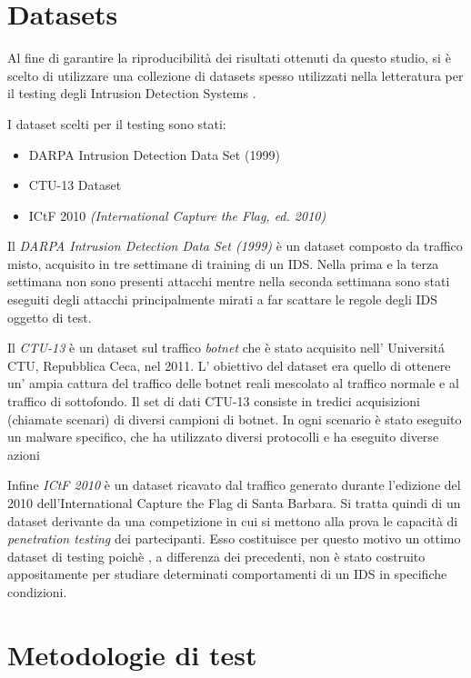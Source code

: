 \documentclass[12pt,a4paper,openright,twoside]{report}
\begin{document}
\section{Datasets}

Al fine di garantire la riproducibilit\`a dei risultati ottenuti da questo studio,
si \`e scelto di utilizzare una collezione di datasets spesso utilizzati nella letteratura
per il testing degli Intrusion Detection Systems \cite{EXP3}.

I dataset scelti per il testing sono stati:
\begin{itemize}
  \item DARPA Intrusion Detection Data Set (1999) \cite{EXP4}
  \item CTU-13 Dataset \cite{EXP5}
  \item ICtF 2010 {\it (International Capture the Flag, ed. 2010)} \cite{EXP6}
\end{itemize}

Il {\it DARPA Intrusion Detection Data Set (1999)} \`e un dataset composto da traffico misto,
 acquisito in tre settimane di training di un IDS. Nella prima e la terza settimana non
sono presenti attacchi mentre nella seconda settimana sono stati eseguiti degli attacchi
principalmente mirati a far scattare le regole degli IDS oggetto di test.

Il {\it CTU-13} \`e un dataset sul traffico {\it botnet} che \`e stato acquisito nell' Universit\'a CTU,
Repubblica Ceca, nel 2011. L' obiettivo del dataset era quello di ottenere un' ampia cattura
del traffico delle botnet reali mescolato al traffico normale e al traffico di sottofondo.
Il set di dati CTU-13 consiste in tredici acquisizioni (chiamate scenari) di diversi campioni
di botnet. In ogni scenario \`e stato eseguito un malware specifico, che ha utilizzato
diversi protocolli e ha eseguito diverse azioni

Infine {\it ICtF 2010} \`e un dataset ricavato dal traffico generato durante l'edizione del
2010 dell'International Capture the Flag di Santa Barbara. Si tratta quindi di un dataset
derivante da una competizione in cui si mettono alla prova le capacit\`a di {\it penetration
testing} dei partecipanti. Esso costituisce per questo motivo un ottimo dataset di testing poich\`e
, a differenza dei precedenti, non \`e stato
costruito appositamente per studiare determinati comportamenti di un IDS in specifiche
condizioni.

\section{Metodologie di test}
\end{document}
